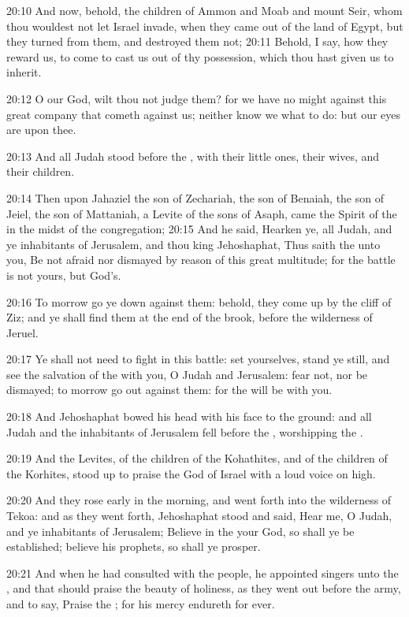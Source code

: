 20:10 And now, behold, the children of Ammon and Moab and mount Seir, whom thou wouldest not let Israel invade, when they came out of the land of Egypt, but they turned from them, and destroyed them not; 20:11 Behold, I say, how they reward us, to come to cast us out of thy possession, which thou hast given us to inherit.

20:12 O our God, wilt thou not judge them? for we have no might against this great company that cometh against us; neither know we what to do: but our eyes are upon thee.

20:13 And all Judah stood before the \LORD, with their little ones, their wives, and their children.

20:14 Then upon Jahaziel the son of Zechariah, the son of Benaiah, the son of Jeiel, the son of Mattaniah, a Levite of the sons of Asaph, came the Spirit of the \LORD in the midst of the congregation; 20:15 And he said, Hearken ye, all Judah, and ye inhabitants of Jerusalem, and thou king Jehoshaphat, Thus saith the \LORD unto you, Be not afraid nor dismayed by reason of this great multitude; for the battle is not yours, but God's.

20:16 To morrow go ye down against them: behold, they come up by the cliff of Ziz; and ye shall find them at the end of the brook, before the wilderness of Jeruel.

20:17 Ye shall not need to fight in this battle: set yourselves, stand ye still, and see the salvation of the \LORD with you, O Judah and Jerusalem: fear not, nor be dismayed; to morrow go out against them: for the \LORD will be with you.

20:18 And Jehoshaphat bowed his head with his face to the ground: and all Judah and the inhabitants of Jerusalem fell before the \LORD, worshipping the \LORD.

20:19 And the Levites, of the children of the Kohathites, and of the children of the Korhites, stood up to praise the \LORD God of Israel with a loud voice on high.

20:20 And they rose early in the morning, and went forth into the wilderness of Tekoa: and as they went forth, Jehoshaphat stood and said, Hear me, O Judah, and ye inhabitants of Jerusalem; Believe in the \LORD your God, so shall ye be established; believe his prophets, so shall ye prosper.

20:21 And when he had consulted with the people, he appointed singers unto the \LORD, and that should praise the beauty of holiness, as they went out before the army, and to say, Praise the \LORD; for his mercy endureth for ever.

